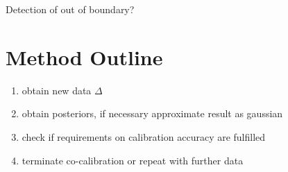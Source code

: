 \documentclass[10pt]{article}
\begin{document}
Detection of out of boundary?


\section{Method Outline}
\begin{enumerate}
    \item obtain new data $\Delta$
    \item obtain posteriors, if necessary approximate result as gaussian
    \item check if requirements on calibration accuracy are fulfilled
    \item terminate co-calibration or repeat with further data
\end{enumerate}



    
\end{document}
